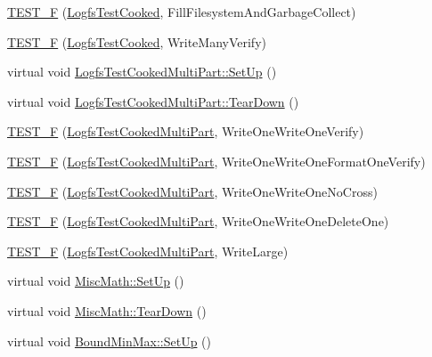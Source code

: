 \begin{DoxyCompactItemize}
\item 
\hyperlink{group___unit_tests_ga3a5ba5e7649f2e14d3092f671c996e3e}{\-T\-E\-S\-T\-\_\-\-F} (\hyperlink{class_logfs_test_cooked}{\-Logfs\-Test\-Cooked}, \-Fill\-Filesystem\-And\-Garbage\-Collect)
\item 
\hyperlink{group___unit_tests_ga64b4ab283359ebc3533f35a7fb7e6fe3}{\-T\-E\-S\-T\-\_\-\-F} (\hyperlink{class_logfs_test_cooked}{\-Logfs\-Test\-Cooked}, \-Write\-Many\-Verify)
\item 
virtual void \hyperlink{group___unit_tests_ga6143b6807b4ed29675a12d317dda0b87}{\-Logfs\-Test\-Cooked\-Multi\-Part\-::\-Set\-Up} ()
\item 
virtual void \hyperlink{group___unit_tests_ga5031a2adb8db0e1125f0f2f2e5d0c82b}{\-Logfs\-Test\-Cooked\-Multi\-Part\-::\-Tear\-Down} ()
\item 
\hyperlink{group___unit_tests_ga24a114e324d7b9f86337c08c9f2b6c64}{\-T\-E\-S\-T\-\_\-\-F} (\hyperlink{class_logfs_test_cooked_multi_part}{\-Logfs\-Test\-Cooked\-Multi\-Part}, \-Write\-One\-Write\-One\-Verify)
\item 
\hyperlink{group___unit_tests_ga66d2a26c55d24d0da23b04752a7a6fb0}{\-T\-E\-S\-T\-\_\-\-F} (\hyperlink{class_logfs_test_cooked_multi_part}{\-Logfs\-Test\-Cooked\-Multi\-Part}, \-Write\-One\-Write\-One\-Format\-One\-Verify)
\item 
\hyperlink{group___unit_tests_ga764d406c79c1ec4236e5f03c1fc48e46}{\-T\-E\-S\-T\-\_\-\-F} (\hyperlink{class_logfs_test_cooked_multi_part}{\-Logfs\-Test\-Cooked\-Multi\-Part}, \-Write\-One\-Write\-One\-No\-Cross)
\item 
\hyperlink{group___unit_tests_ga4b1eaeb81dc020435304ff23a66895c8}{\-T\-E\-S\-T\-\_\-\-F} (\hyperlink{class_logfs_test_cooked_multi_part}{\-Logfs\-Test\-Cooked\-Multi\-Part}, \-Write\-One\-Write\-One\-Delete\-One)
\item 
\hyperlink{group___unit_tests_ga4ae6529c9fa155129efba3de7100b3d9}{\-T\-E\-S\-T\-\_\-\-F} (\hyperlink{class_logfs_test_cooked_multi_part}{\-Logfs\-Test\-Cooked\-Multi\-Part}, \-Write\-Large)
\item 
virtual void \hyperlink{group___unit_tests_gaf32e95ea690177429881d65ee89a43e2}{\-Misc\-Math\-::\-Set\-Up} ()
\item 
virtual void \hyperlink{group___unit_tests_gaee049bdfbeb6e7117415c472da634038}{\-Misc\-Math\-::\-Tear\-Down} ()
\item 
virtual void \hyperlink{group___unit_tests_gaa083f26ac602b6553ebd522ebce74b44}{\-Bound\-Min\-Max\-::\-Set\-Up} ()
\item 

\end{DoxyCompactItemize}
